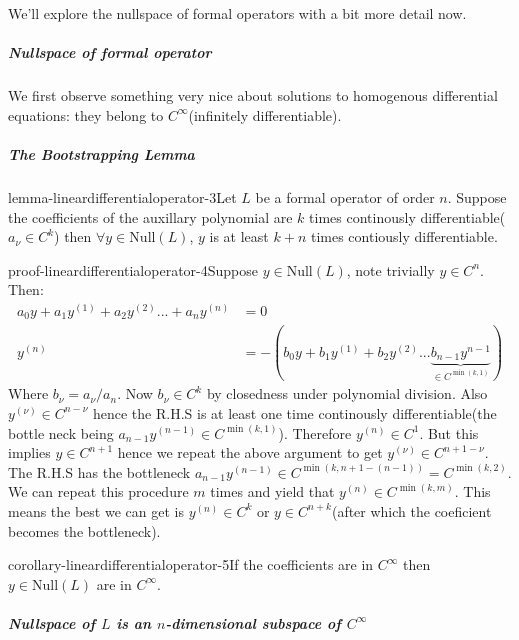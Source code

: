 We'll explore the nullspace of formal operators with a bit more detail now.

\subparagraph{Nullspace of formal operator}

We first observe something very nice about solutions to homogenous differential equations: they belong to $C^{\infty}$(infinitely differentiable).

\subparagraph{The Bootstrapping Lemma}

\begin{mystthmlemma}{}{lemma-lineardifferentialoperator-3}Let $L$ be a formal operator of order $n$. Suppose the coefficients of the auxillary polynomial are $k$ times continously differentiable($a_{\nu}\in C^k$) then $\forall y\in \mathrm{Null}(L)$, $y$ is at least $k+n$ times contiously differentiable.

\end{mystthmlemma}
\begin{mystthmproof}{}{proof-lineardifferentialoperator-4}Suppose $y\in \mathrm{Null}(L)$, note trivially $y\in C^n$. Then:
\begin{equation}
\begin{aligned}
a_0y+a_1y^{(1)}+a_2y^{(2)}...+a_n y^{(n)} &=0 \\
y^{(n)} &= -(b_0y+b_1y^{(1)}+b_2y^{(2)}...\underbrace{b_{n-1}{y}^{n-1}}_{\in C^{\min(k, 1)}})
\end{aligned}
\end{equation}
Where $b_{\nu}=a_{\nu}/a_{n}$. Now $b_{\nu}\in C^k$ by closedness under polynomial division. Also $y^{(\nu)} \in C^{n -\nu}$ hence the R.H.S is at least one time continously differentiable(the bottle neck being $a_{n -1}y^{(n -1)} \in C^{\min(k, 1)}$). Therefore $y^{(n)}\in C^1$. But this implies $y\in C^{n+1}$ hence we repeat the above argument to get $y^{(\nu)}\in C^{n+1 -\nu}$. The R.H.S has the bottleneck $a_{n -1}y^{(n -1)}\in C^{\min(k, n+1 -(n -1))}=C^{\min(k, 2)}$. We can repeat this procedure $m$ times and yield that $y^{(n)}\in C^{\min(k, m)}$. This means the best we can get is $y^{(n)}\in C^k$ or $y\in C^{n+k}$(after which the coeficient becomes the bottleneck).

\end{mystthmproof}
\begin{mystthmcorollary}{}{corollary-lineardifferentialoperator-5}If the coefficients are in $C^{\infty}$ then $y\in \mathrm{Null}(L)$ are in $C^{\infty}$.

\end{mystthmcorollary}
\subparagraph{Nullspace of $L$ is an $n$-dimensional subspace of $C^{\infty}$}

